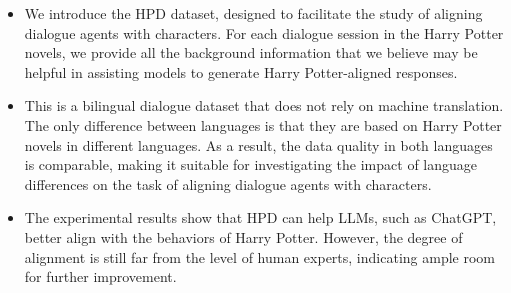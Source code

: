 \documentclass[11pt]{article}
\begin{document}
\begin{itemize}
    \item We introduce the HPD dataset, designed to facilitate the study of aligning dialogue agents with characters. For each dialogue session in the Harry Potter novels, we provide all the background information that we believe may be helpful in assisting models to generate Harry Potter-aligned responses.
    \item This is a bilingual dialogue dataset that does not rely on machine translation. The only difference between languages is that they are based on Harry Potter novels in different languages. As a result, the data quality in both languages is comparable, making it suitable for investigating the impact of language differences on the task of aligning dialogue agents with characters.
    \item The experimental results show that HPD can help LLMs, such as ChatGPT, better align with the behaviors of Harry Potter. However, the degree of alignment is still far from the level of human experts, indicating ample room for further improvement.
\end{itemize}











 





 






















 

 
 
 
 
 


 
\end{document}

